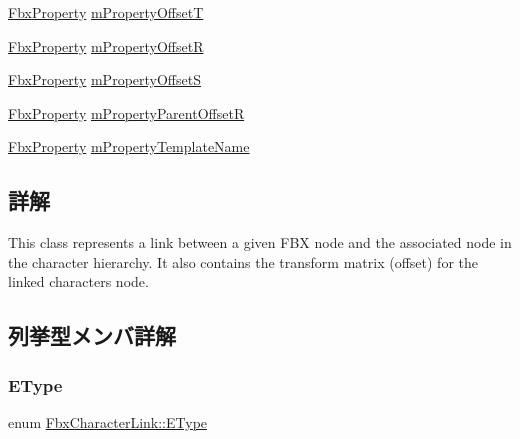 \begin{DoxyCompactItemize}
\hyperlink{class_fbx_property}{Fbx\+Property} \hyperlink{class_fbx_character_link_a18377611c261651720685a86ef9667c9}{m\+Property\+OffsetT}
\item 
\hyperlink{class_fbx_property}{Fbx\+Property} \hyperlink{class_fbx_character_link_a9fb8ef5de919ec31a796862a4ed03887}{m\+Property\+OffsetR}
\item 
\hyperlink{class_fbx_property}{Fbx\+Property} \hyperlink{class_fbx_character_link_a4e7c76fa3879a30381b75d331cc1e7fb}{m\+Property\+OffsetS}
\item 
\hyperlink{class_fbx_property}{Fbx\+Property} \hyperlink{class_fbx_character_link_a535d899bd4df8b1c000bf3c54d1b7bb3}{m\+Property\+Parent\+OffsetR}
\item 
\hyperlink{class_fbx_property}{Fbx\+Property} \hyperlink{class_fbx_character_link_a342f087e28119642e18d2339a32eb17d}{m\+Property\+Template\+Name}
\end{DoxyCompactItemize}


\subsection{詳解}
This class represents a link between a given F\+BX node and the associated node in the character hierarchy. It also contains the transform matrix (offset) for the linked character\textquotesingle{}s node. 

\subsection{列挙型メンバ詳解}
\mbox{\label{class_fbx_character_link_ae90994844e941f231b6be3d59e21cdce}} 
\subsubsection{\texorpdfstring{E\+Type}{EType}}
{\footnotesize\ttfamily enum \hyperlink{class_fbx_character_link_ae90994844e941f231b6be3d59e21cdce}{Fbx\+Character\+Link\+::\+E\+Type}}


